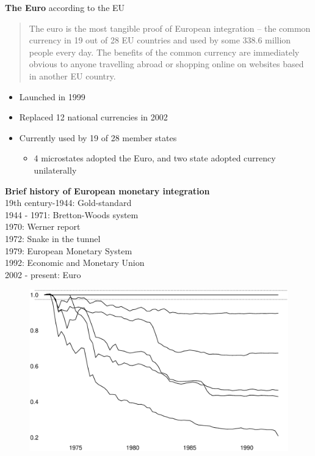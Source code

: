\documentclass{beamer}
\begin{document}
\begin{frame}
  \textbf{The Euro} according to the EU
  \begin{quote}
    The euro is the most tangible proof of European integration – the common currency in 19 out of 28 EU countries and used by some 338.6 million people every day. The benefits of the common currency are immediately obvious to anyone travelling abroad or shopping online on websites based in another EU country.
  \end{quote}
  \medskip
  \begin{itemize}
    \item Launched in 1999
    \item Replaced 12 national currencies in 2002
    \item Currently used by 19 of 28 member states
    \begin{itemize}
      \item 4 microstates adopted the Euro, and two state adopted currency unilaterally
    \end{itemize}
  \end{itemize}
\end{frame}

\begin{frame}
  \textbf{Brief history of European monetary integration}\\
  \medskip
  19th century-1944: Gold-standard \\
  1944 - 1971: Bretton-Woods system\\
  1970: Werner report\\
  1972: Snake in the tunnel\\
  1979: European Monetary System\\
  1992: Economic and Monetary Union\\
  2002 - present: Euro  
\end{frame}

\begin{frame}
  \begin{figure}
    \includegraphics[scale=.3]{snake.eps}
  \end{figure}
\end{frame}
\end{document}

